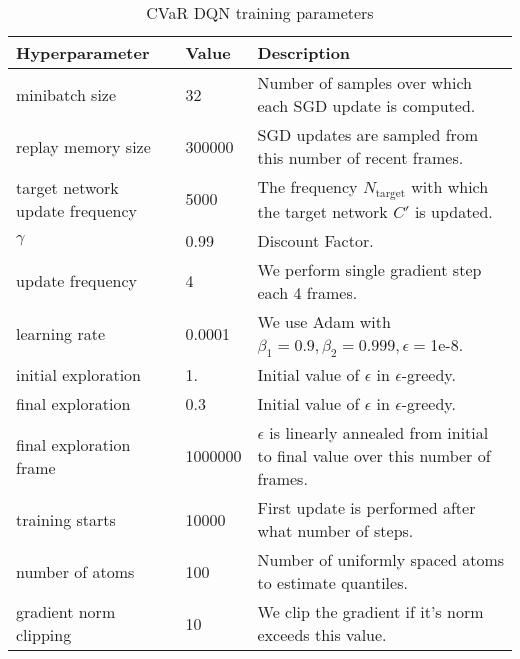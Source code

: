 \begin{table}[h]
\centering
\caption{CVaR DQN training parameters}
\label{dqnparams}
\begin{tabular}{l|l|p{7cm}}
\textbf{Hyperparameter}         & \textbf{Value} & \textbf{Description}                                                                    \\\hline
minibatch size                  & 32             & Number of samples over which each SGD update is computed.                               \\
replay memory size              & 300000         & SGD updates are sampled from this number of recent frames.                              \\
target network update frequency & 5000           & The frequency $N_{\text{target}}$ with which the target network $C'$ is updated.        \\
$\gamma$                        & 0.99           & Discount Factor.                                                                        \\
update frequency                & 4              & We perform single gradient step each 4 frames.                                          \\
learning rate                   & 0.0001         & We use Adam with $\beta_1=0.9, \beta_2=0.999, \epsilon=$1e-8.                           \\
initial exploration             & 1.             & Initial value of $\epsilon$ in $\epsilon$-greedy.                                       \\
final exploration               & 0.3            & Initial value of $\epsilon$ in $\epsilon$-greedy.                                       \\
final exploration frame         & 1000000        & $\epsilon$ is linearly annealed from initial to final value over this number of frames. \\
training starts                 & 10000          & First update is performed after what number of steps.                                   \\
number of atoms                 & 100            & Number of uniformly spaced atoms to estimate quantiles.                                 \\
gradient norm clipping          & 10             & We clip the gradient if it's norm exceeds this value.                                  
\end{tabular}
\end{table}
